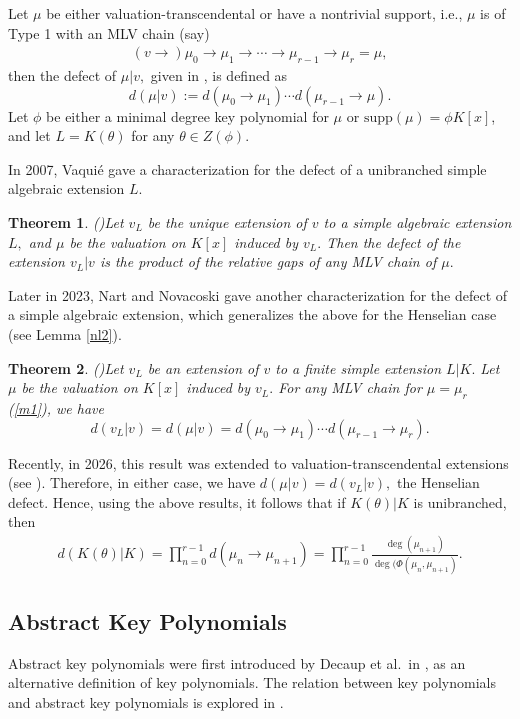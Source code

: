 \documentclass[11pt]{amsart}
\newtheorem{theorem}{Theorem}[section]
\theoremstyle{definition}
\theoremstyle{remark}
\numberwithin{equation}{section}
\begin{document}
 	Let $\mu$ be either valuation-transcendental or have a nontrivial support, i.e., $\mu$ is of Type 1 with an MLV chain (say)
 	\begin{align}\label{m1}
 				(v \longrightarrow) \mu_0  \longrightarrow \mu_1  \longrightarrow \cdots  \longrightarrow \mu_{r-1}  \longrightarrow \mu_r=\mu ,
 				\end{align}
 			then the defect of $\mu|v,$ given in \cite{EN3}, is defined as
 			\[d(\mu|v):=d(\mu_0\longrightarrow \mu_1) \cdots d(\mu_{r-1}\longrightarrow \mu).\]
 			Let $\phi$ be either a minimal degree key polynomial for $\mu$ or $\text{supp}(\mu)=\phi K[x]$, and let $L=K(\theta)$ for any $\theta\in Z(\phi).$  
 			
 			In 2007, Vaqui\'e gave a characterization for the defect of a unibranched simple algebraic extension $L$.
 			\begin{theorem}(\cite[Corollary 2.10]{V2})\label{vth1}
 				Let $v_L$ be the unique extension of $v$ to a simple algebraic extension $L,$ and $\mu$ be the valuation on $K[x]$ induced by $v_L.$ Then the defect of the extension $v_L|v$ is the product of the relative gaps of any MLV chain of $\mu.$
 			\end{theorem} 	Later in 2023, Nart and Novacoski gave another characterization for the defect of a simple algebraic extension, which generalizes the above for the Henselian case (see Lemma \ref{nl2}).
 			
 			\begin{theorem}(\cite[Theorem 6.14]{EN3})\label{T2}
 			Let $v_L$ be an extension of $v$ to a finite simple extension $L|K.$ Let $\mu$ be the valuation on $K[x]$ induced by $v_L.$ For any MLV chain for $\mu=\mu_r$ (\ref{m1}), we have\[d(v_L|v)=d(\mu|v)=d(\mu_0\longrightarrow \mu_1)\cdots d(\mu_{r-1}\longrightarrow \mu_r).\]
 			\end{theorem}
 		 Recently, in 2026, this result was extended to valuation-transcendental extensions (see \cite[Theorem 4.10]{NA}). Therefore, in either case, we have $d(\mu|v)=d(v_L|v),$ the Henselian defect. Hence, using the above results, it follows that if $K(\theta)|K$ is unibranched, then  
 			\begin{align}\label{ev}
 				d(K(\theta)|K)=\prod_{n=0}^{r-1} d(\mu_n\longrightarrow \mu_{n+1})=\prod_{n=0}^{r-1}\frac{\deg(\mu_{n+1})}{\deg(\Phi(\mu_n,\mu_{n+1})}.
 				\end{align}
 		
 			
 	\subsection{Abstract Key Polynomials}
 		Abstract key polynomials were first introduced by Decaup et al.\  in \cite{DSM}, as an alternative definition of key polynomials.
 			 The relation between key polynomials and abstract key polynomials is explored in \cite{Ma, DSM,NS}. 
 			
\end{document}
